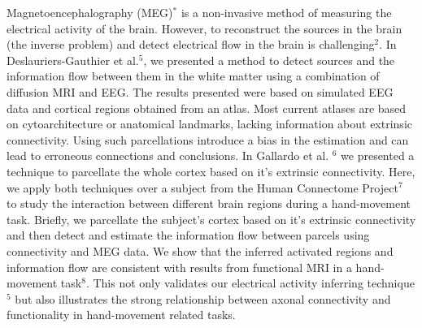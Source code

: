 Magnetoencephalography (MEG)$^*$ is a non-invasive method of measuring the
electrical activity of the brain. However, to reconstruct the sources in
the brain (the inverse problem) and detect electrical flow in the brain is
challenging$^2$. In Deslauriers-Gauthier et al.$^5$, we presented a method
to detect sources and the information flow between them in the white matter
using a combination of diffusion MRI and EEG. The results presented were based
on simulated EEG data and cortical regions obtained from an atlas. Most current
atlases are based on cytoarchitecture or anatomical landmarks, lacking
information about extrinsic connectivity. Using such parcellations introduce
a bias in the estimation and can lead to erroneous connections and conclusions.
In Gallardo et al. $^6$ we presented a technique to parcellate the whole cortex
based on it's extrinsic connectivity. Here, we apply both techniques over a
subject from the Human Connectome Project$^7$ to study the interaction between
different brain regions during a hand-movement task. Briefly, we parcellate the
subject's cortex based on it's extrinsic connectivity and then detect and
estimate the information flow between parcels using connectivity and MEG data.
We show that the inferred activated regions and information flow are consistent
with results from functional MRI in a hand-movement task$^8$. This not only
validates our electrical activity inferring technique$^5$ but also illustrates
the strong relationship between axonal connectivity and functionality in
hand-movement related tasks. 

